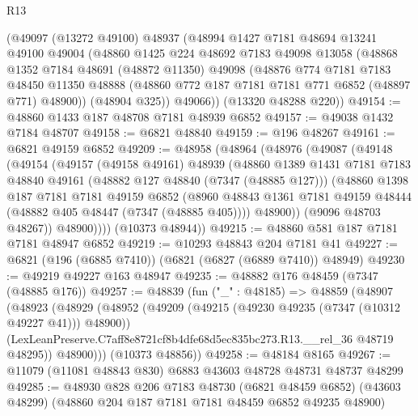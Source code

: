 \begin{lexlean}{R13}
\begin{coremodule}
    (@49097
      (@13272 @49100)
      @48937
      (@48994
        @1427
        @7181
        @48694
        @13241
        @49100
        @49004
        (@48860
          @1425
          @224
          @48692
          @7183
          @49098
          @13058
          (@48868
            @1352
            @7184
            @48691
            (@48872 @11350)
            @49098
            (@48876
              @774
              @7181
              @7183
              @48450
              @11350
              @48888
              (@48860 @772 @187 @7181 @7181 @771 @6852 (@48897 @771) @48900))
            (@48904 @325))
          @49066))
      (@13320 @48288 @220))
@49154 := @48860 @1433 @187 @48708 @7181 @48939 @6852
@49157 := @49038 @1432 @7184 @48707
@49158 := @6821 @48840
@49159 := @196 @48267
@49161 := @6821 @49159 @6852
@49209 := @48958
    (@48964
      (@48976
        (@49087
          (@49148
            (@49154
              (@49157
                (@49158 @49161)
                @48939
                (@48860
                  @1389
                  @1431
                  @7181
                  @7183
                  @48840
                  @49161
                  (@48882 @127 @48840 (@7347 (@48885 @127)))
                  (@48860
                    @1398
                    @187
                    @7181
                    @7181
                    @49159
                    @6852
                    (@8960
                      @48843
                      @1361
                      @7181
                      @49159
                      @48444
                      (@48882 @405 @48447 (@7347 (@48885 @405))))
                    @48900))
                (@9096 @48703 @48267))
              @48900))))
      (@10373 @48944))
@49215 := @48860 @581 @187 @7181 @7181 @48947 @6852
@49219 := @10293 @48843 @204 @7181 @41
@49227 := @6821 (@196 (@6885 @7410)) (@6821 (@6827 (@6889 @7410)) @48949)
@49230 := @49219 @49227 @163 @48947
@49235 := @48882 @176 @48459 (@7347 (@48885 @176))
@49257 := @48839
    (fun ("_" : @48185) =>
    @48859
      (@48907
        (@48923
          (@48929
            (@48952
              (@49209 (@49215 (@49230 @49235 (@7347 (@10312 @49227 @41))) @48900))
              (LexLeanPreserve.C7aff8e8721cf8b4dfe68d5ec835bc273.R13.__rel_36 @48719 @48295))
            @48900)))
      (@10373 @48856))
@49258 := @48184 @8165
@49267 := @11079 (@11081 @48843 @830) @6883 @43603 @48728 @48731 @48737 @48299
@49285 := @48930
    @828
    @206
    @7183
    @48730
    (@6821 @48459 @6852)
    (@43603 @48299)
    (@48860 @204 @187 @7181 @7181 @48459 @6852 @49235 @48900)

\end{coremodule}
\end{lexlean}
